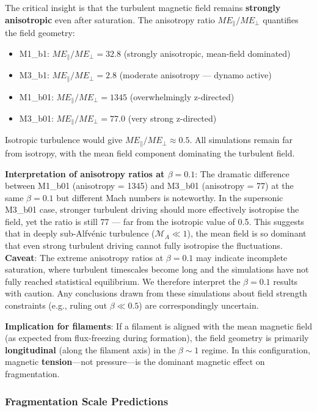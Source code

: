 \documentclass[11pt,a4paper]{article}
\begin{document}
The critical insight is that the turbulent magnetic field remains \textbf{strongly anisotropic} even after saturation. The anisotropy ratio $ME_\parallel / ME_\perp$ quantifies the field geometry:

\begin{itemize}
    \item M1\_b1: $ME_\parallel/ME_\perp = 32.8$ (strongly anisotropic, mean-field dominated)
    \item M3\_b1: $ME_\parallel/ME_\perp = 2.8$ (moderate anisotropy — dynamo active)
    \item M1\_b01: $ME_\parallel/ME_\perp = 1345$ (overwhelmingly z-directed)
    \item M3\_b01: $ME_\parallel/ME_\perp = 77.0$ (very strong z-directed)
\end{itemize}

Isotropic turbulence would give $ME_\parallel/ME_\perp \approx 0.5$. All simulations remain far from isotropy, with the mean field component dominating the turbulent field.

\textbf{Interpretation of anisotropy ratios at $\beta = 0.1$}: The dramatic difference between M1\_b01 (anisotropy = 1345) and M3\_b01 (anisotropy = 77) at the same $\beta = 0.1$ but different Mach numbers is noteworthy. In the supersonic M3\_b01 case, stronger turbulent driving should more effectively isotropise the field, yet the ratio is still 77 — far from the isotropic value of 0.5. This suggests that in deeply sub-Alfv\'enic turbulence ($\mathcal{M}_A \ll 1$), the mean field is so dominant that even strong turbulent driving cannot fully isotropise the fluctuations. \textbf{Caveat}: The extreme anisotropy ratios at $\beta = 0.1$ may indicate incomplete saturation, where turbulent timescales become long and the simulations have not fully reached statistical equilibrium. We therefore interpret the $\beta = 0.1$ results with caution. Any conclusions drawn from these simulations about field strength constraints (e.g., ruling out $\beta \ll 0.5$) are correspondingly uncertain.

\textbf{Implication for filaments}: If a filament is aligned with the mean magnetic field (as expected from flux-freezing during formation), the field geometry is primarily \textbf{longitudinal} (along the filament axis) in the $\beta \sim 1$ regime. In this configuration, magnetic \textbf{tension}—not pressure—is the dominant magnetic effect on fragmentation.

\subsubsection{Fragmentation Scale Predictions}
\end{document}
